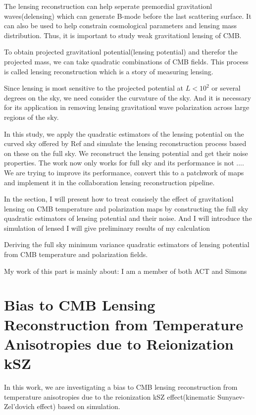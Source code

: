 \documentclass[12pt, notitlepage, onecolumn, amsmath, amssymb, aps]{revtex4-1}
\begin{document}
The lensing reconstruction can help seperate premordial gravitationl waves(delensing) which can generate B-mode before the last scattering surface. It can also be used to help constrain cosmological parameters and lensing mass distribution. Thus, it is important to study weak gravitationl lensing of CMB.

To obtain projected gravitationl potential(lensing potential) and therefor the projected mass, we can take quadratic combinations of CMB fields. This process is called lensing reconstruction which is a story of measuring lensing. 

Since lensing is most sensitive to the projected potential at \(L<10^2\) or several degrees on the sky, we need consider the curvature of the sky. And it is necessary for its application in removing lensing gravitationl wave polarization across large regions of the sky.

In this study, we apply the quadratic estimators of the lensing potential on the curved sky offered by Ref\cite{Okamoto:2003zw} and simulate the lensing reconstruction process based on these on the full sky. We reconstruct the lensing potential and get their noise properties. The work now only works for full sky and its performance is not ....  We are trying to improve its performance, convert this to a patchwork of maps and implement it in the collaboration lensing reconstruction pipeline.

In the section, I will present how to treat consisely the effect of gravitationl lensing on CMB temperature and polarization maps by constructing the full sky quadratic estimators of lensing potential and their noise. And I will introduce the simulation of lensed I will give preliminary results of my calculation 

Deriving the full sky minimum variance quadratic estimators of lensing potential from CMB temperature and polarization fields.

My work of this part is mainly about:
I am a member of both ACT and Simons


\section{Bias to CMB Lensing Reconstruction from Temperature Anisotropies due to Reionization kSZ}
\label{sec:org093d799}
In this work, we are investigating a bias to CMB lensing reconstruction from temperature anisotropies due to the reionization kSZ effect(kinematic Sunyaev-Zel'dovich effect) based on simulation.
\end{document}
